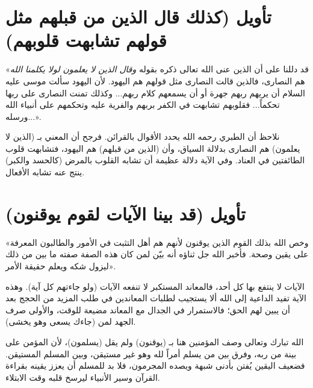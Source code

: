 \separator

\section{تأويل (كذلك قال الذين من قبلهم مثل قولهم تشابهت قلوبهم)}
 «قد دللنا على أن الذين عنى الله تعالى ذكره بقوله \textit{وقال الذين لا يعلمون لولا يكلمنا الله} هم النصارى، فالذين قالت النصارى مثل قولهم هم اليهود. لأن اليهود سألت موسى عليه السلام أن يريهم ربهم جهرة أو أن يسمعهم كلام ربهم... وكذلك تمنت النصارى على ربها تحكماً... فقلوبهم تشابهت في الكفر بربهم والفرية عليه وتحكمهم على أنبياء الله ورسله...».

\begin{fawaid}
نلاحظ أن الطبري رحمه الله يحدد الأقوال بالقرائن. فرجح أن المعني بـ (الذين لا يعلمون) هم النصارى بدلالة السياق، وأن (الذين من قبلهم) هم اليهود، فتشابهت قلوب الطائفتين في العناد. وفي الآية دلالة عظيمة أن تشابه القلوب بالمرض (كالحسد والكبر) ينتج عنه تشابه الأفعال.
\end{fawaid}

\separator

\section{تأويل (قد بينا الآيات لقوم يوقنون)}
 «وخص الله بذلك القوم الذين يوقنون لأنهم هم أهل التثبت في الأمور والطالبون المعرفة على يقين وصحة. فأخبر الله جل ثناؤه أنه بيّن لمن كان هذه الصفة صفته ما بين من ذلك ليزول شكه ويعلم حقيقة الأمر».

\begin{fawaid}
الآيات لا ينتفع بها كل أحد، فالمعاند المستكبر لا تنفعه الآيات (ولو جاءتهم كل آية). وهذه الآية تفيد الداعية إلى الله ألا يستجيب لطلبات المعاندين في طلب المزيد من الحجج بعد أن يبين لهم الحق؛ فالاستمرار في الجدال مع المعاند مضيعة للوقت، والأولى صرف الجهد لمن (جاءك يسعى وهو يخشى).
\end{fawaid}

\begin{fawaid}
الله تبارك وتعالى وصف المؤمنين هنا بـ (يوقنون) ولم يقل (يسلمون)، لأن المؤمن على بينة من ربه، وفرق بين من يسلم أمراً لله وهو غير مستيقن، وبين المسلم المستيقن. فضعيف اليقين يُفتن بأدنى شبهة ويصده المجرمون، فلا بد للمسلم أن يعزز يقينه بقراءة القرآن وسير الأنبياء ليرسخ قلبه وقت الابتلاء.
\end{fawaid}

\separator

